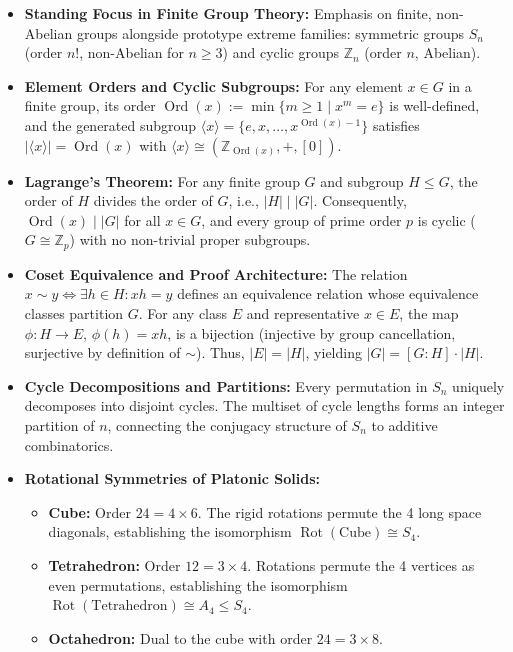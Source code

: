 \begin{overview}
\begin{itemize}
    \item \textbf{Standing Focus in Finite Group Theory:} Emphasis on finite, non-Abelian groups alongside prototype extreme families: symmetric groups $S_n$ (order $n!$, non-Abelian for $n \ge 3$) and cyclic groups $\mathbb{Z}_n$ (order $n$, Abelian).
    \item \textbf{Element Orders and Cyclic Subgroups:} For any element $x \in G$ in a finite group, its order $\operatorname{Ord}(x) := \min \{m \ge 1 \mid x^m = e\}$ is well-defined, and the generated subgroup $\langle x \rangle = \{e, x, \dots, x^{\operatorname{Ord}(x)-1}\}$ satisfies $|\langle x \rangle| = \operatorname{Ord}(x)$ with $\langle x \rangle \cong (\mathbb{Z}_{\operatorname{Ord}(x)}, +, [0])$.
    \item \textbf{Lagrange's Theorem:} For any finite group $G$ and subgroup $H \le G$, the order of $H$ divides the order of $G$, i.e., $|H| \mid |G|$. Consequently, $\operatorname{Ord}(x) \mid |G|$ for all $x \in G$, and every group of prime order $p$ is cyclic ($G \cong \mathbb{Z}_p$) with no non-trivial proper subgroups.
    \item \textbf{Coset Equivalence and Proof Architecture:} The relation $x \sim y \iff \exists h \in H \colon xh = y$ defines an equivalence relation whose equivalence classes partition $G$. For any class $E$ and representative $x \in E$, the map $\phi \colon H \to E$, $\phi(h) = xh$, is a bijection (injective by group cancellation, surjective by definition of $\sim$). Thus, $|E| = |H|$, yielding $|G| = [G : H] \cdot |H|$.
    \item \textbf{Cycle Decompositions and Partitions:} Every permutation in $S_n$ uniquely decomposes into disjoint cycles. The multiset of cycle lengths forms an integer partition of $n$, connecting the conjugacy structure of $S_n$ to additive combinatorics.
    \item \textbf{Rotational Symmetries of Platonic Solids:}
    \begin{itemize}
        \item \textbf{Cube:} Order $24 = 4 \times 6$. The rigid rotations permute the 4 long space diagonals, establishing the isomorphism $\operatorname{Rot}(\text{Cube}) \cong S_4$.
        \item \textbf{Tetrahedron:} Order $12 = 3 \times 4$. Rotations permute the 4 vertices as even permutations, establishing the isomorphism $\operatorname{Rot}(\text{Tetrahedron}) \cong A_4 \le S_4$.
        \item \textbf{Octahedron:} Dual to the cube with order $24 = 3 \times 8$.
    \end{itemize}
\end{itemize}
\end{overview}